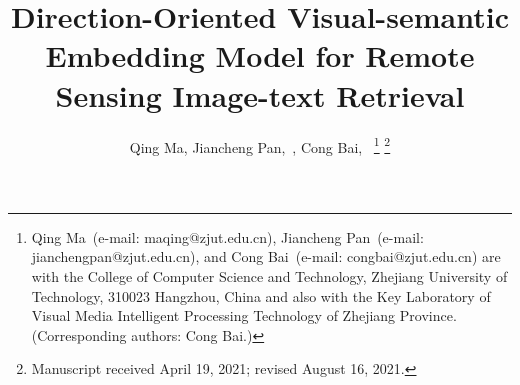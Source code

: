 \documentclass[journal]{IEEEtran}
\begin{document}
\title{Direction-Oriented Visual-semantic Embedding Model for Remote Sensing Image-text Retrieval}

\author{
Qing Ma,
Jiancheng Pan\hspace{-1.5mm}\orcidA{},~,
Cong Bai\hspace{-1.5mm}\orcidB{},~
\thanks{Qing Ma~(e-mail: maqing@zjut.edu.cn), Jiancheng Pan~(e-mail: jianchengpan@zjut.edu.cn), and Cong Bai~(e-mail: congbai@zjut.edu.cn) are with the College of Computer Science and Technology, Zhejiang University of Technology, 310023 Hangzhou, China and also with the Key Laboratory of Visual Media Intelligent Processing Technology of Zhejiang Province. (Corresponding authors: Cong Bai.)}
\thanks{Manuscript received April 19, 2021; revised August 16, 2021.}}
\end{document}
